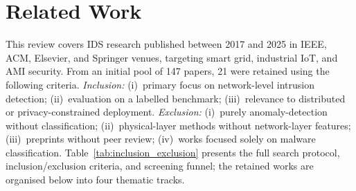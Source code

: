 \documentclass[sensors,article,submit,pdftex,moreauthors]{Definitions/mdpi}
\begin{document}
\section{Related Work}\label{r2}

This review covers IDS research published between 2017 and 2025 in IEEE, ACM, Elsevier, and Springer venues, targeting smart grid, industrial IoT, and AMI security. From an initial pool of 147 papers, 21 were retained using the following criteria. \textit{Inclusion:} (i)~primary focus on network-level intrusion detection; (ii)~evaluation on a labelled benchmark; (iii)~relevance to distributed or privacy-constrained deployment. \textit{Exclusion:} (i)~purely anomaly-detection without classification; (ii)~physical-layer methods without network-layer features; (iii)~preprints without peer review; (iv)~works focused solely on malware classification. Table~\ref{tab:inclusion_exclusion} presents the full search protocol, inclusion/exclusion criteria, and screening funnel; the retained works are organised below into four thematic tracks.
\end{document}
